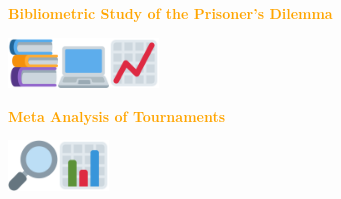\documentclass{beamer}
\begin{document}
\begin{frame}
    \begin{center}
    
    \end{center}
\end{frame}

\begin{frame}
    \begin{center}
    \textcolor{orange}{\large{\textbf{Bibliometric Study of the Prisoner's Dilemma}}} \vspace{1cm}
    
    \includegraphics[width=0.10\textwidth]{static/books.png}\hspace{2pt}\includegraphics[width=0.10\textwidth]{static/pc.png}\hspace{2pt}\includegraphics[width=0.10\textwidth]{static/chart.png}
    \end{center}
\end{frame}

\begin{frame}
    \begin{center}
    \textcolor{orange}{\large{\textbf{Meta Analysis of Tournaments}}} \vspace{1cm}

    \includegraphics[width=0.10\textwidth]{static/look.png}\hspace{2pt}\includegraphics[width=0.10\textwidth]{static/bar.png}
    \end{center}
\end{frame}
\end{document}
